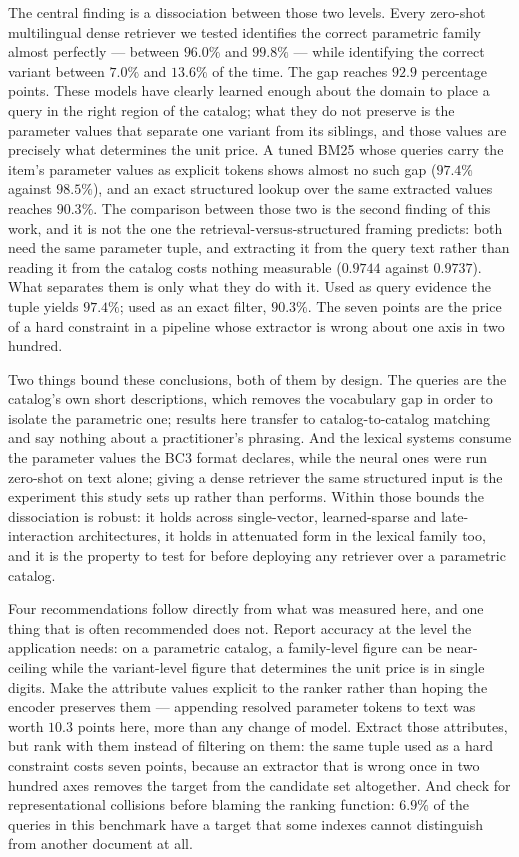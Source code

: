 \documentclass[preprint,review,12pt]{elsarticle}
\begin{document}
The central finding is a dissociation between those two levels. Every zero-shot multilingual dense retriever we tested identifies the correct parametric family almost perfectly --- between $96.0\%$ and $99.8\%$ --- while identifying the correct variant between $7.0\%$ and $13.6\%$ of the time. The gap reaches $92.9$ percentage points. These models have clearly learned enough about the domain to place a query in the right region of the catalog; what they do not preserve is the parameter values that separate one variant from its siblings, and those values are precisely what determines the unit price. A tuned BM25 whose queries carry the item's parameter values as explicit tokens shows almost no such gap ($97.4\%$ against $98.5\%$), and an exact structured lookup over the same extracted values reaches $90.3\%$. The comparison between those two is the second finding of this work, and it is not the one the retrieval-versus-structured framing predicts: both need the same parameter tuple, and extracting it from the query text rather than reading it from the catalog costs nothing measurable ($0.9744$ against $0.9737$). What separates them is only what they do with it. Used as query evidence the tuple yields $97.4\%$; used as an exact filter, $90.3\%$. The seven points are the price of a hard constraint in a pipeline whose extractor is wrong about one axis in two hundred.

Two things bound these conclusions, both of them by design. The queries are the catalog's own short descriptions, which removes the vocabulary gap in order to isolate the parametric one; results here transfer to catalog-to-catalog matching and say nothing about a practitioner's phrasing. And the lexical systems consume the parameter values the BC3 format declares, while the neural ones were run zero-shot on text alone; giving a dense retriever the same structured input is the experiment this study sets up rather than performs. Within those bounds the dissociation is robust: it holds across single-vector, learned-sparse and late-interaction architectures, it holds in attenuated form in the lexical family too, and it is the property to test for before deploying any retriever over a parametric catalog.


Four recommendations follow directly from what was measured here, and one thing that is often recommended does not. Report accuracy at the level the application needs: on a parametric catalog, a family-level figure can be near-ceiling while the variant-level figure that determines the unit price is in single digits. Make the attribute values explicit to the ranker rather than hoping the encoder preserves them --- appending resolved parameter tokens to text was worth $10.3$ points here, more than any change of model. Extract those attributes, but rank with them instead of filtering on them: the same tuple used as a hard constraint costs seven points, because an extractor that is wrong once in two hundred axes removes the target from the candidate set altogether. And check for representational collisions before blaming the ranking function: $6.9\%$ of the queries in this benchmark have a target that some indexes cannot distinguish from another document at all.
\end{document}
